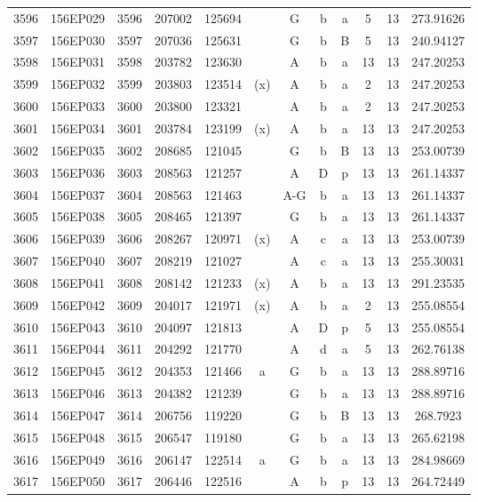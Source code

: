 \begin{tabular}{|*{12}{c|}}
3596 & 156EP029 & 3596 & 207002 & 125694 &  & G & b & a & 5 & 13 & 273.91626 \\ 
3597 & 156EP030 & 3597 & 207036 & 125631 &  & G & b & B & 5 & 13 & 240.94127 \\ 
3598 & 156EP031 & 3598 & 203782 & 123630 &  & A & b & a & 13 & 13 & 247.20253 \\ 
3599 & 156EP032 & 3599 & 203803 & 123514 & (x) & A & b & a & 2 & 13 & 247.20253 \\ 
3600 & 156EP033 & 3600 & 203800 & 123321 &  & A & b & a & 2 & 13 & 247.20253 \\ 
3601 & 156EP034 & 3601 & 203784 & 123199 & (x) & A & b & a & 13 & 13 & 247.20253 \\ 
3602 & 156EP035 & 3602 & 208685 & 121045 &  & G & b & B & 13 & 13 & 253.00739 \\ 
3603 & 156EP036 & 3603 & 208563 & 121257 &  & A & D & p & 13 & 13 & 261.14337 \\ 
3604 & 156EP037 & 3604 & 208563 & 121463 &  & A-G & b & a & 13 & 13 & 261.14337 \\ 
3605 & 156EP038 & 3605 & 208465 & 121397 &  & G & b & a & 13 & 13 & 261.14337 \\ 
3606 & 156EP039 & 3606 & 208267 & 120971 & (x) & A & c & a & 13 & 13 & 253.00739 \\ 
3607 & 156EP040 & 3607 & 208219 & 121027 &  & A & c & a & 13 & 13 & 255.30031 \\ 
3608 & 156EP041 & 3608 & 208142 & 121233 & (x) & A & b & a & 13 & 13 & 291.23535 \\ 
3609 & 156EP042 & 3609 & 204017 & 121971 & (x) & A & b & a & 2 & 13 & 255.08554 \\ 
3610 & 156EP043 & 3610 & 204097 & 121813 &  & A & D & p & 5 & 13 & 255.08554 \\ 
3611 & 156EP044 & 3611 & 204292 & 121770 &  & A & d & a & 5 & 13 & 262.76138 \\ 
3612 & 156EP045 & 3612 & 204353 & 121466 & a & G & b & a & 13 & 13 & 288.89716 \\ 
3613 & 156EP046 & 3613 & 204382 & 121239 &  & G & b & a & 13 & 13 & 288.89716 \\ 
3614 & 156EP047 & 3614 & 206756 & 119220 &  & G & b & B & 13 & 13 & 268.7923 \\ 
3615 & 156EP048 & 3615 & 206547 & 119180 &  & G & b & a & 13 & 13 & 265.62198 \\ 
3616 & 156EP049 & 3616 & 206147 & 122514 & a & G & b & a & 13 & 13 & 284.98669 \\ 
3617 & 156EP050 & 3617 & 206446 & 122516 &  & A & b & p & 13 & 13 & 264.72449 \\ 

\end{tabular}
